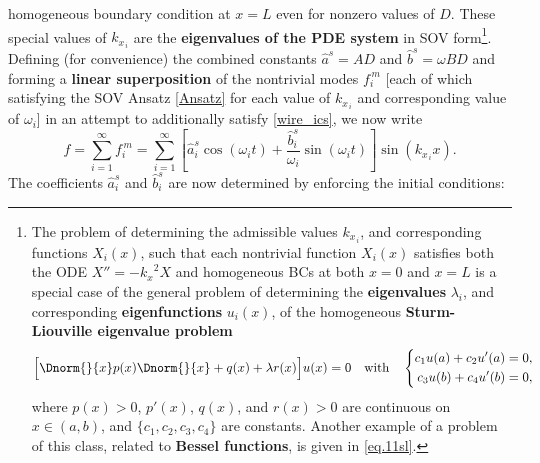 homogeneous boundary condition at $x=L$ even for nonzero values of
$D$.  These special values of $k_{x_{\,i}}$ are the {\bf eigenvalues of the PDE system} in SOV form\footnote{The \label{foot:Sturm-Liouville} problem
of determining the admissible values $k_{x_{\,i}}$, and corresponding functions $X_i(x)$, such that each nontrivial function $X_i(x)$ satisfies both
the ODE $X'' = - {k_x}^2 X$ and homogeneous BCs
at both $x=0$ and $x=L$ is a special case of the general problem of determining the {\bf eigenvalues} $\lambda_i$,
and corresponding {\bf eigenfunctions} $u_i(x)$, of the homogeneous {\bf Sturm-Liouville eigenvalue problem}
\begin{equation*}
  \Big[\Dnorm{}{x} p(x) \Dnorm{}{x} + q(x) + \lambda r(x) \Big] u(x) = 0 \quad \textrm{with} \quad
  \left\{ \begin{aligned} c_1 u(a) + c_2 u'(a) = 0, \\ c_3 u(b) + c_4 u'(b) = 0, \end{aligned}
  \right.
\end{equation*}
where $p(x)>0$, $p'(x)$, $q(x)$, and $r(x)>0$ are continuous on $x\in (a,b)$, and $\{c_1,c_2,c_3,c_4\}$ are constants.
Another example of a problem of this class, related to {\bf Bessel functions}, is given in \eqref{eq.11sl}.}.
Defining (for convenience) the combined constants $\hat a^s = A D$ and $\hat b^s = \omega B D$ and forming a {\bf linear superposition} of the nontrivial modes $f^{\,m}_i$
[each of which satisfying the SOV Ansatz \eqref{Ansatz} for each value of $k_{x_{\,i}}$ and
corresponding value of $\omega_i$] in an attempt to additionally satisfy \eqref{wire_ics}, we now write
\begin{equation}
f=\sum_{i=1}^{\infty} f^{\,m}_i
 =\sum_{i=1}^{\infty} \left[\hat a_i^s \cos(\omega_i t) +
				\frac{\hat b_i^s}{\omega_i} \sin(\omega_i t) \right]
				\sin (k_{x_{\,i}} x).
\label{linearcomb}
\end{equation}
The coefficients $\hat a_i^s$ and $\hat b_i^s$ are now determined by enforcing the initial conditions:
